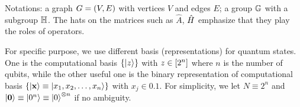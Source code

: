 Notations: a graph $G=(V,E)$ with vertices $V$ and edges $E$; a group $\mathbb{G}$ with a subgroup $\mathbb{H}$. 
The hats on the matrices such as $\hat{A}$, $\hat{H}$ emphasize that they play the roles of operators.

For specific purpose, we use different basis (representations) for quantum states.
One is the computational basis $\qty{\ket{z}}$ with $z\in \qty[2^n]$ where $n$ is the number of qubits,
while the other useful one is the binary representation of computational basis $\qty{\ket{\vb{x}}\equiv\ket{x_1,x_2,\dots,x_n}}$ with $x_j\in \qty{0,1}$. 
For simplicity, we let $N \equiv 2^n$ and $\ket{\vb{0}}\equiv\ket{0^n} \equiv\ket{0}^{\otimes n}$ if no ambiguity.


